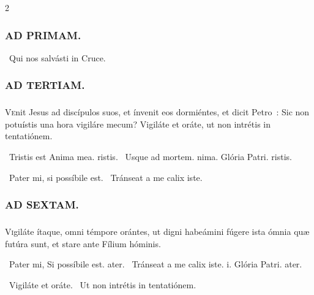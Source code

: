 \documentclass[9pt,twoside]{extarticle}
\begin{document}
\begin{multicols}{2}
\begin{tightlist}{}
\item {}
\end{tightlist}

\subsubsection*{\center \textsc{AD PRIMAM.}}
\begin{tightlist}{}
\item {}~Qui nos salvásti in Cruce.
\end{tightlist}

\subsubsection*{\center \textsc{AD TERTIAM.}}
\subsubsection*{}
\lettrine{V}enit Jesus ad discípulos suos, et ínvenit eos dormiéntes, et dicit Petro~: Sic non potuístis una hora vigiláre mecum? Vigiláte et oráte, ut non intrétis in tentatiónem.

\begin{tightlist}{}
\item {}~Tristis est \textred{*} Anima mea. ristis. ~Usque ad mortem. nima. Glória Patri. ristis.
\item {}~Pater mi, si possíbile est. ~Tránseat a me calix iste.
\end{tightlist}
\subsubsection*{\center \textsc{AD SEXTAM.}}
\subsubsection*{}
\lettrine{V}igiláte ítaque, omni témpore orántes, ut digni habeámini fúgere ista ómnia quæ futúra sunt, et stare ante Fílium hóminis.

\begin{tightlist}{}
\item {}~Pater mi, \textred{*} Si possíbile est. ater. ~Tránseat a me calix iste. i. Glória Patri. ater.
\item {}~Vigiláte et oráte. ~Ut non intrétis in tentatiónem.
\end{tightlist}


\end{multicols}
\end{document}
